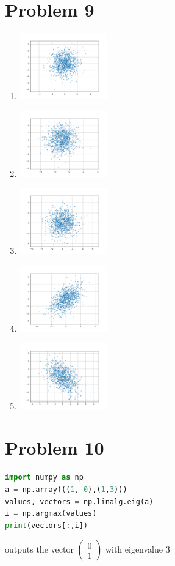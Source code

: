 \documentclass[11pt]{article}
\newcommand{\solution}[1]{{{\color{blue}{\bf Solution:} {#1}}}}
\begin{document}
\section{Problem 9}
\solution{
    \begin{enumerate}
        \item
             \includegraphics[width=0.3\textwidth]{9-a.png} 
        \item 
            \includegraphics[width=0.3\textwidth]{9-b.png}
        \item 
            \includegraphics[width=0.3\textwidth]{9-c.png}
        \item 
            \includegraphics[width=0.3\textwidth]{9-d.png}
        \item
            \includegraphics[width=0.3\textwidth]{9-e.png}
    \end{enumerate}
}
\section{Problem 10}
\begin{lstlisting}[language=Python]
import numpy as np
a = np.array(((1, 0),(1,3)))
values, vectors = np.linalg.eig(a)
i = np.argmax(values)
print(vectors[:,i])
\end{lstlisting}
\solution{
    outputs the vector $\begin{pmatrix} 0 \\ 1 \end{pmatrix} $ with eigenvalue $3$
}
\end{document}

